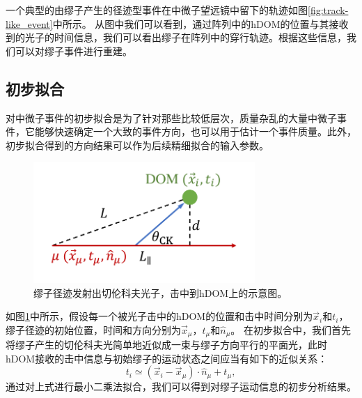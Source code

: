 一个典型的由缪子产生的径迹型事件在中微子望远镜中留下的轨迹如图\ref{fig:track-like_event}中所示。
从图中我们可以看到，通过阵列中的hDOM的位置与其接收到的光子的时间信息，我们可以看出缪子在阵列中的穿行轨迹。根据这些信息，我们可以对缪子事件进行重建。

\subsection{初步拟合}
\label{subsec:track_reco_first_guess}

对中微子事件的初步拟合是为了针对那些比较低层次，质量杂乱的大量中微子事件，它能够快速确定一个大致的事件方向，也可以用于估计一个事件质量\cite{line_fit:2013, ANTARES_q_fit:2011}。此外，初步拟合得到的方向结果可以作为后续精细拟合的输入参数。

\begin{figure}[!htb]%
    \centering
    \includegraphics[width=0.75\textwidth]{img/Cherenkov_geometry_DOM_observation.pdf}
    \caption{缪子径迹发射出切伦科夫光子，击中到hDOM上的示意图。}
    \label{fig:Cherenkov_geometry_DOM_observation}
\end{figure}

如图\ref{fig:Cherenkov_geometry_DOM_observation}中所示，假设每一个被光子击中的hDOM的位置和击中时间分别为$\vec{x}_i$和$t_i$，缪子径迹的初始位置，时间和方向分别为$\vec{x}_\mu$，$t_\mu$和$\hat{n}_\mu$。
在初步拟合中，我们首先将缪子产生的切伦科夫光简单地近似成一束与缪子方向平行的平面光，此时hDOM接收的击中信息与初始缪子的运动状态之间应当有如下的近似关系：
\begin{equation}
    t_i \simeq (\vec{x}_i - \vec{x}_\mu) \cdot \hat{n}_\mu + t_\mu ,
\end{equation}
通过对上式进行最小二乘法拟合，我们可以得到对缪子运动信息的初步分析结果。

